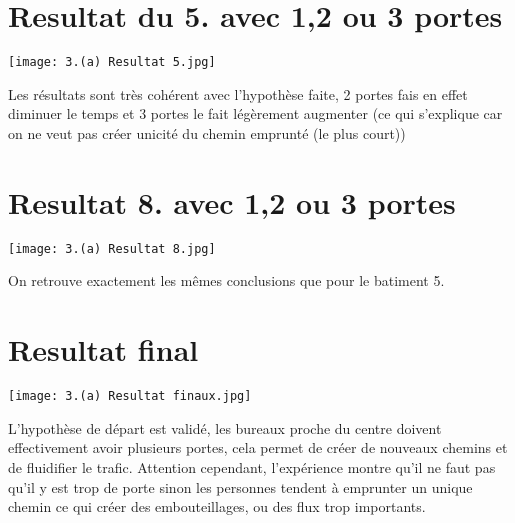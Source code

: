 \documentclass[12pt]{article}
\begin{document}
\section{Resultat du 5. avec 1,2 ou 3 portes}
\texttt{[image: 3.(a) Resultat 5.jpg]}
\newline\newline

Les résultats sont très cohérent avec l'hypothèse faite, 2 portes fais en effet diminuer le temps et 3 portes le fait légèrement augmenter
(ce qui s'explique car on ne veut pas créer unicité du chemin emprunté (le plus court))


\section{Resultat 8. avec 1,2 ou 3 portes}
\texttt{[image: 3.(a) Resultat 8.jpg]}
\newline\newline

On retrouve exactement les mêmes conclusions que pour le batiment 5.

\section{Resultat final}
\texttt{[image: 3.(a) Resultat finaux.jpg]}
\newline\newline


L'hypothèse de départ est validé, les bureaux proche du centre doivent effectivement avoir plusieurs portes, cela permet de créer de nouveaux chemins
et de fluidifier le trafic.
\newline\newline
Attention cependant, l'expérience montre qu'il ne faut pas qu'il y est trop de porte sinon les personnes tendent à emprunter un unique chemin ce qui créer des embouteillages,
ou des flux trop importants.
\end{document}
